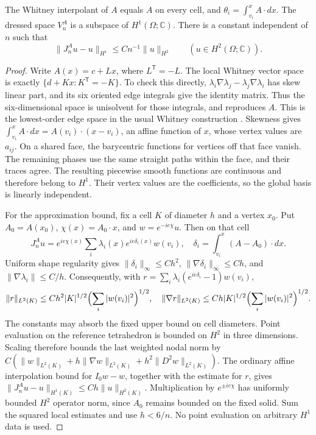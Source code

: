 \begin{lemma}
\label{lem:whitney-magnetic-conforming-approximation}
The Whitney interpolant of \(A\) equals \(A\) on every cell, and
\(\theta_i=\int_{v_i}^x A\cdot dx\). The dressed space
\(V_n^A\) is a subspace of \(H^1(\Omega;\mathbb C)\).
There is a constant independent of \(n\) such that
\begin{equation}
 \|J_n^Au-u\|_{H^1}\leq C n^{-1}\|u\|_{H^2}
 \qquad (u\in H^2(\Omega;\mathbb C)).
 \label{eq:whitney-magnetic-interpolation}
\end{equation}
\end{lemma}
\begin{proof}
Write \(A(x)=c+Lx\), where \(L^\mathsf T=-L\).
The local Whitney vector space is exactly
\(\{d+Kx:K^\mathsf T=-K\}\). To check this directly,
\(\lambda_i\nabla\lambda_j-\lambda_j\nabla\lambda_i\)
has skew linear part, and its six oriented edge integrals give the
identity matrix. Thus the six-dimensional space is unisolvent for those
integrals, and reproduces \(A\). This is the lowest-order edge
space in the usual Whitney construction \cite{ArnoldFalkWinther2010}.
Skewness gives
\(\int_{v_i}^x A\cdot dx=A(v_i)\cdot(x-v_i)\),
an affine function of \(x\), whose vertex values are \(a_{ij}\).
On a shared face, the barycentric functions for vertices off that face
vanish. The remaining phases use the same straight paths within the
face, and their traces agree. The resulting piecewise smooth functions
are continuous and therefore belong to \(H^1\). Their vertex values
are the coefficients, so the global basis is linearly independent.

For the approximation bound, fix a cell \(K\) of diameter \(h\)
and a vertex \(x_0\). Put \(A_0=A(x_0)\),
\(\chi(x)=A_0\cdot x\), and \(w=e^{-ie\chi}u\).
Then on that cell
\[
 J_n^Au=e^{ie\chi(x)}
       \sum_i\lambda_i(x)e^{ie\delta_i(x)}w(v_i),
 \quad
 \delta_i=\int_{v_i}^x(A-A_0)\cdot dx.
\]
Uniform shape regularity gives
\(\|\delta_i\|_\infty\leq Ch^2\),
\(\|\nabla\delta_i\|_\infty\leq Ch\), and
\(\|\nabla\lambda_i\|\leq C/h\). Consequently, with
\(r=\sum_i\lambda_i(e^{ie\delta_i}-1)w(v_i)\),
\[
 \|r\|_{L^2(K)}\leq Ch^2 |K|^{1/2}
                         \Bigl(\sum_i|w(v_i)|^2\Bigr)^{1/2},
 \quad
 \|\nabla r\|_{L^2(K)}\leq Ch |K|^{1/2}
                         \Bigl(\sum_i|w(v_i)|^2\Bigr)^{1/2}.
\]
The constants may absorb the fixed upper bound on cell diameters.
Point evaluation on the reference tetrahedron is bounded on \(H^2\)
in three dimensions. Scaling therefore bounds the last weighted nodal
norm by
\(C(\|w\|_{L^2(K)}+h\|\nabla w\|_{L^2(K)}
+h^2\|D^2w\|_{L^2(K)})\).
The ordinary affine interpolation bound for \(I_0w-w\), together
with the estimate for \(r\), gives
\(\|J_n^Au-u\|_{H^1(K)}\leq Ch\|u\|_{H^2(K)}\).
Multiplication by \(e^{\pm ie\chi}\) has uniformly bounded
\(H^2\) operator norm, since \(A_0\) remains bounded on the
fixed solid. Sum the squared local estimates and use \(h<6/n\).
No point evaluation on arbitrary \(H^1\) data is used.
\end{proof}

